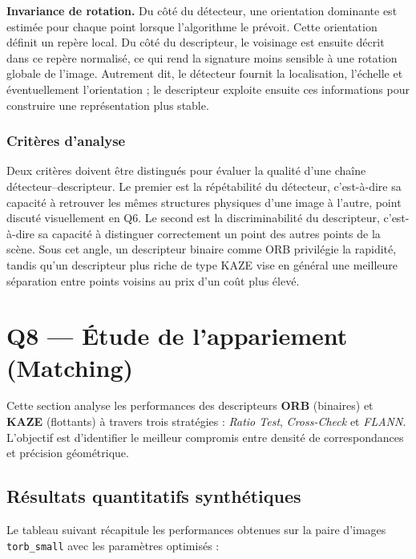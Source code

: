 \documentclass[11pt,a4paper]{article}
\begin{document}
\textbf{Invariance de rotation.} Du côté du détecteur, une orientation dominante est estimée pour chaque point lorsque l'algorithme le prévoit. Cette orientation définit un repère local. Du côté du descripteur, le voisinage est ensuite décrit dans ce repère normalisé, ce qui rend la signature moins sensible à une rotation globale de l'image. Autrement dit, le détecteur fournit la localisation, l'échelle et éventuellement l'orientation ; le descripteur exploite ensuite ces informations pour construire une représentation plus stable.

\subsubsection{Critères d'analyse}
Deux critères doivent être distingués pour évaluer la qualité d'une chaîne détecteur--descripteur. Le premier est la répétabilité du détecteur, c'est-à-dire sa capacité à retrouver les mêmes structures physiques d'une image à l'autre, point discuté visuellement en Q6. Le second est la discriminabilité du descripteur, c'est-à-dire sa capacité à distinguer correctement un point des autres points de la scène. Sous cet angle, un descripteur binaire comme ORB privilégie la rapidité, tandis qu'un descripteur plus riche de type KAZE vise en général une meilleure séparation entre points voisins au prix d'un coût plus élevé.


\section{Q8 --- Étude de l'appariement (Matching)}

Cette section analyse les performances des descripteurs \textbf{ORB} (binaires) et \textbf{KAZE} (flottants) à travers trois stratégies : \textit{Ratio Test}, \textit{Cross-Check} et \textit{FLANN}. L'objectif est d'identifier le meilleur compromis entre densité de correspondances et précision géométrique.

\subsection{Résultats quantitatifs synthétiques}

Le tableau suivant récapitule les performances obtenues sur la paire d'images \texttt{torb\_small} avec les paramètres optimisés :
\end{document}
